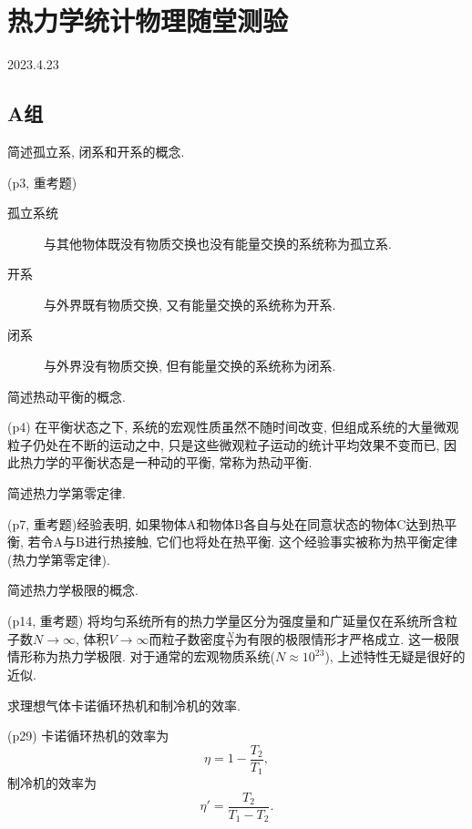 \section{热力学统计物理随堂测验}
2023.4.23
\subsection{A组}
\begin{questions}
  \question 简述孤立系, 闭系和开系的概念.
  \begin{solution}
    (p3, 重考题)
    \begin{description}
      \item[孤立系统] 与其他物体既没有物质交换也没有能量交换的系统称为孤立系.
      \item[开系] 与外界既有物质交换, 又有能量交换的系统称为开系.
      \item[闭系] 与外界没有物质交换, 但有能量交换的系统称为闭系.
    \end{description}
  \end{solution}
  \question 简述热动平衡的概念.
  \begin{solution}
    (p4) 在平衡状态之下, 系统的宏观性质虽然不随时间改变, 但组成系统的大量微观粒子仍处在不断的运动之中, 只是这些微观粒子运动的统计平均效果不变而已, 因此热力学的平衡状态是一种动的平衡, 常称为热动平衡.
  \end{solution}
  \question 简述热力学第零定律.
  \begin{solution}
    (p7, 重考题)经验表明, 如果物体A和物体B各自与处在同意状态的物体C达到热平衡, 若令A与B进行热接触, 它们也将处在热平衡. 这个经验事实被称为热平衡定律(热力学第零定律).
  \end{solution}
  \question 简述热力学极限的概念.
  \begin{solution}
    (p14, 重考题) 将均匀系统所有的热力学量区分为强度量和广延量仅在系统所含粒子数$N\to\infty$, 体积$V\to\infty$而粒子数密度$\frac{N}{V}$为有限的极限情形才严格成立. 这一极限情形称为热力学极限. 对于通常的宏观物质系统($N\approx 10^{23}$), 上述特性无疑是很好的近似.
  \end{solution}
  \question 求理想气体卡诺循环热机和制冷机的效率.
  \begin{solution}
    (p29) 卡诺循环热机的效率为
    \begin{equation}
      \eta = 1-\frac{T_2}{T_1},
    \end{equation}
    制冷机的效率为
    \begin{equation}
      \eta' = \frac{T_2}{T_1-T_2}.
    \end{equation}

\end{solution}
\end{questions}
